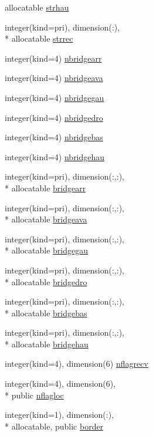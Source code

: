 \begin{DoxyCompactItemize}
allocatable \hyperlink{classmodfofmpi_a9ace6e4f0b23785f3b93fe1812b07c08}{strhau}
\item 
integer(kind=pri), dimension(\-:), \\*
allocatable \hyperlink{classmodfofmpi_ada00af1a25f50e826521e9b2a7ecb633}{strrec}
\item 
integer(kind=4) \hyperlink{classmodfofmpi_a887d577430624ed6c6e8952b089e0576}{nbridgearr}
\item 
integer(kind=4) \hyperlink{classmodfofmpi_a2ce30cec8604582ad8aaa26ef19b41cb}{nbridgeava}
\item 
integer(kind=4) \hyperlink{classmodfofmpi_a000b4f4f0140c24648780b86d56698cf}{nbridgegau}
\item 
integer(kind=4) \hyperlink{classmodfofmpi_a0253e42a34623e4816f27522252d1e29}{nbridgedro}
\item 
integer(kind=4) \hyperlink{classmodfofmpi_ad71e96722537b8de69afdb8f68028e8b}{nbridgebas}
\item 
integer(kind=4) \hyperlink{classmodfofmpi_a81ecc186519e9addf2dbf7ec92e32d23}{nbridgehau}
\item 
integer(kind=pri), dimension(\-:,\-:), \\*
allocatable \hyperlink{classmodfofmpi_a3dffef2edd7b2899179cb3ffffd62430}{bridgearr}
\item 
integer(kind=pri), dimension(\-:,\-:), \\*
allocatable \hyperlink{classmodfofmpi_a9891331c8f9f2ef3b5532b96129683ac}{bridgeava}
\item 
integer(kind=pri), dimension(\-:,\-:), \\*
allocatable \hyperlink{classmodfofmpi_a157af8da53311980e23d05748e181a7f}{bridgegau}
\item 
integer(kind=pri), dimension(\-:,\-:), \\*
allocatable \hyperlink{classmodfofmpi_a400402d1fc58970ecda00536a07c021c}{bridgedro}
\item 
integer(kind=pri), dimension(\-:,\-:), \\*
allocatable \hyperlink{classmodfofmpi_a2bdd3864a996f2afb8e49bbcdbd120e5}{bridgebas}
\item 
integer(kind=pri), dimension(\-:,\-:), \\*
allocatable \hyperlink{classmodfofmpi_a5a9577c42a1c3c53db8eb603945b530b}{bridgehau}
\item 
integer(kind=4), dimension(6) \hyperlink{classmodfofmpi_aa8c0fc08baf8d208d7e2cddd0600ff99}{nflagrecv}
\item 
integer(kind=4), dimension(6), \\*
public \hyperlink{classmodfofmpi_a9b2252c09a83a3f47fc6aec6462a68dc}{nflagloc}
\item 
integer(kind=1), dimension(\-:), \\*
allocatable, public \hyperlink{classmodfofmpi_adb1afd2b26b96173f56ab37495e99e99}{border}
\end{DoxyCompactItemize}


